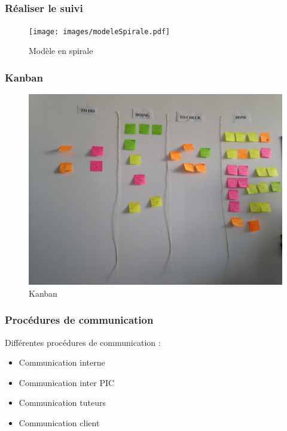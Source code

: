 \subsection{}

\begin{frame}
\frametitle{Réaliser le suivi}
\begin{figure}
\begin{center}
\texttt{[image: images/modeleSpirale.pdf]}
\caption{Modèle en spirale}
\label{MS}
\end{center}
\end{figure}
\end{frame}

\begin{frame}
\frametitle{Kanban}
\begin{figure}
\includegraphics[scale=0.075]{images/kanban.JPG}
\caption{Kanban}
\label{Kn}
\end{figure}
\end{frame}

\begin{frame}
\frametitle{Procédures de communication}
Différentes procédures de communication :
\begin{itemize}
\item Communication interne
\item Communication inter PIC
\item Communication tuteurs
\item Communication client
\end{itemize}
\end{frame}
